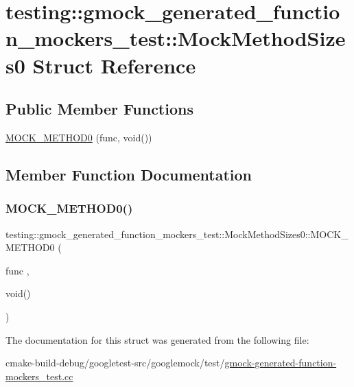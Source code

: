 \hypertarget{structtesting_1_1gmock__generated__function__mockers__test_1_1MockMethodSizes0}{}\section{testing\+::gmock\+\_\+generated\+\_\+function\+\_\+mockers\+\_\+test\+::Mock\+Method\+Sizes0 Struct Reference}
\label{structtesting_1_1gmock__generated__function__mockers__test_1_1MockMethodSizes0}
\subsection*{Public Member Functions}
\begin{DoxyCompactItemize}
\item 
\mbox{\hyperlink{structtesting_1_1gmock__generated__function__mockers__test_1_1MockMethodSizes0_ad72a29f7a84b94e60a6697952d086ec9}{M\+O\+C\+K\+\_\+\+M\+E\+T\+H\+O\+D0}} (func, void())
\end{DoxyCompactItemize}


\subsection{Member Function Documentation}
\mbox{\label{structtesting_1_1gmock__generated__function__mockers__test_1_1MockMethodSizes0_ad72a29f7a84b94e60a6697952d086ec9}} 
\subsubsection{\texorpdfstring{MOCK\_METHOD0()}{MOCK\_METHOD0()}}
{\footnotesize\ttfamily testing\+::gmock\+\_\+generated\+\_\+function\+\_\+mockers\+\_\+test\+::\+Mock\+Method\+Sizes0\+::\+M\+O\+C\+K\+\_\+\+M\+E\+T\+H\+O\+D0 (\begin{DoxyParamCaption}\item[{func}]{,  }\item[{void()}]{ }\end{DoxyParamCaption})}



The documentation for this struct was generated from the following file\+:\begin{DoxyCompactItemize}
\item 
cmake-\/build-\/debug/googletest-\/src/googlemock/test/\mbox{\hyperlink{gmock-generated-function-mockers__test_8cc}{gmock-\/generated-\/function-\/mockers\+\_\+test.\+cc}}\end{DoxyCompactItemize}
